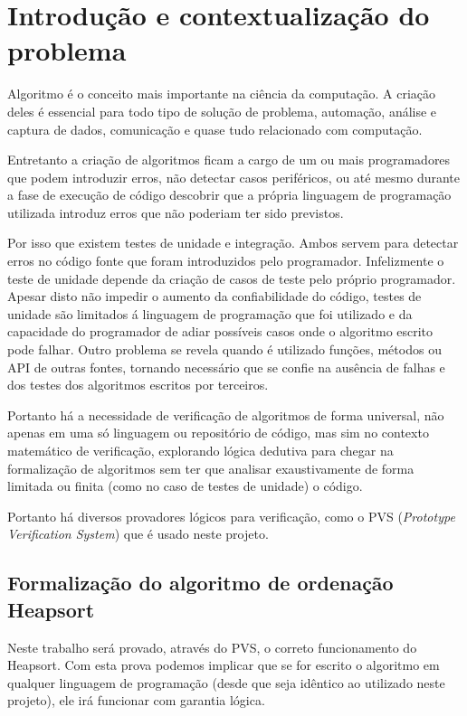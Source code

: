 \chapter{Introdução e contextualização do problema}

Algoritmo é o conceito mais importante na ciência da computação. A criação deles é essencial para todo tipo de solução de problema, automação, análise e captura de dados, comunicação e quase tudo relacionado com computação.

Entretanto a criação de algoritmos ficam a cargo de um ou mais programadores que podem introduzir erros, não detectar casos periféricos, ou até mesmo durante a fase de execução de código descobrir que a própria linguagem de programação utilizada introduz erros que não poderiam ter sido previstos.

Por isso que existem testes de unidade e integração. Ambos servem para detectar erros no código fonte que foram introduzidos pelo programador. Infelizmente o teste de unidade depende da criação de casos de teste pelo próprio programador. Apesar disto não impedir o aumento da confiabilidade do código, testes de unidade são limitados á linguagem de programação que foi utilizado e da capacidade do programador de adiar possíveis casos onde o algoritmo escrito pode falhar. Outro problema se revela quando é utilizado funções, métodos ou API de outras fontes, tornando necessário que se confie na ausência de falhas e dos testes dos algoritmos escritos por terceiros.

Portanto há a necessidade de verificação de algoritmos de forma universal, não apenas em uma só linguagem ou repositório de código, mas sim no contexto matemático de verificação, explorando lógica dedutiva para chegar na formalização de algoritmos sem ter que analisar exaustivamente de forma limitada ou finita (como no caso de testes de unidade) o código.

Portanto há diversos provadores lógicos para verificação, como o PVS (\textit{Prototype Verification System}) que é usado neste projeto.

\section{Formalização do algoritmo de ordenação Heapsort}

Neste trabalho será provado, através do PVS, o correto funcionamento do Heapsort. Com esta prova podemos implicar que se for escrito o algoritmo em qualquer linguagem de programação (desde que seja idêntico ao utilizado neste projeto), ele irá funcionar com garantia lógica.

